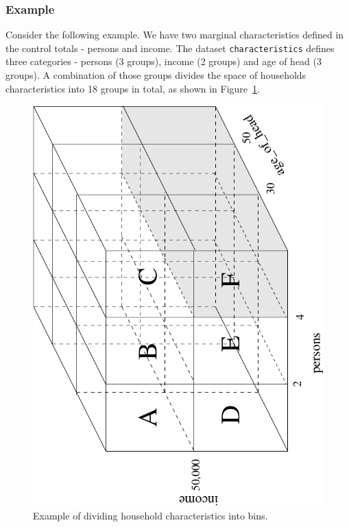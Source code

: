 %
\subsubsection{Example}
%
Consider the following example. We have two marginal characteristics defined
in the control totals - persons and income. The dataset \datasetindex \verb|characteristics|
defines three categories - persons (3 groups), income (2 groups) and age of
head (3 groups). A combination of those groups divides the space of households
characteristics into 18 groups in total, as shown in
Figure~\ref{fig:htm-example}.

\begin{figure}
\begin{center}
\includegraphics[scale=0.5, angle=-90]{images/htmexample.pdf}
\caption{\label{fig:htm-example}\small Example of dividing household
  characteristics into bins.}

\end{center}
\end{figure}

